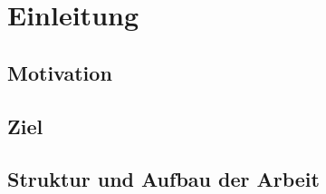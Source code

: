 \chapter{Einleitung}

\section{Motivation}


\section{Ziel} 

\section{Struktur und Aufbau der Arbeit} 

